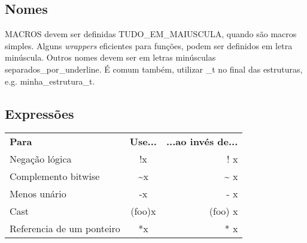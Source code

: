 \documentclass{article}
\begin{document}
\subsection{Nomes}
MACROS devem ser definidas TUDO\_EM\_MAIUSCULA, quando são macros simples. Alguns \emph{wrappers} eficientes para funções, podem ser definidos em letra minúscula. Outros nomes devem ser em letras minúsculas separados\_por\_underline. É comum também, utilizar \_t no final das estruturas, e.g. minha\_estrutura\_t.

\subsection{Expressões}
\begin{tabular}{ l c r }
	{\bf Para} 			& {\bf Use...} 		& {\bf ...ao invés de...} \\
	Negação lógica 			& !x 			& ! x \\
	Complemento bitwise 		& \textasciitilde x 	& \textasciitilde{}  x \\
	Menos unário			& -x			& - x \\
	Cast				& (foo)x		& (foo) x \\
	Referencia de um ponteiro	& *x			& * x \\
\end{tabular}
\end{document}
